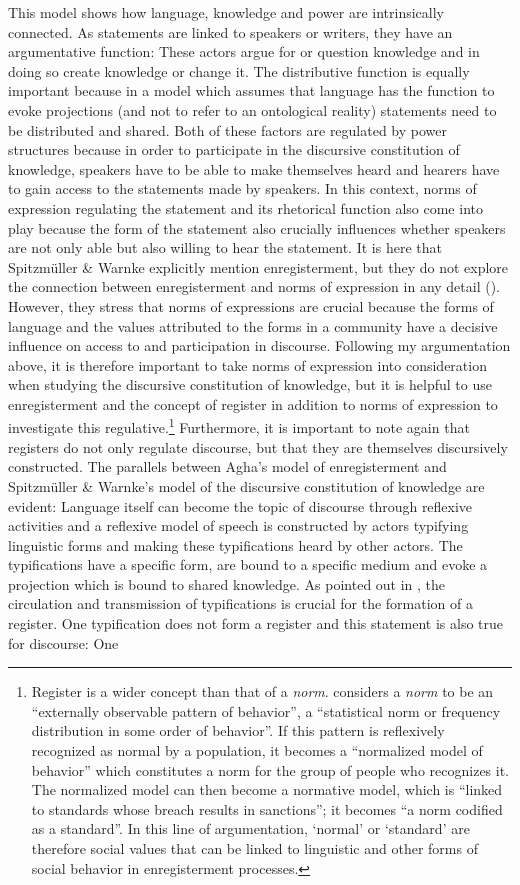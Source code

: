 This model shows how language, knowledge and power are intrinsically connected. As statements are linked to speakers or writers, they have an argumentative function: These actors argue for or question knowledge and in doing so create knowledge or change it. The distributive function is equally important because in a model which assumes that language has the function to evoke projections (and not to refer to an ontological reality) statements need to be distributed and shared. Both of these factors are regulated by power structures because in order to participate in the discursive constitution of knowledge, speakers have to be able to make themselves heard and hearers have to gain access to the statements made by speakers. In this context, norms of expression regulating the statement and its rhetorical function also come into play because the form of the statement also crucially influences whether speakers are not only able but also willing to hear the statement. It is here that Spitzmüller \& Warnke explicitly mention enregisterment, but they do not explore the connection between enregisterment and norms of expression in any detail (\citeyear[61]{Spitzmuller2011}). However, they stress that norms of expressions are crucial because the forms of language and the values attributed to the forms in a community have a decisive influence on access to and participation in discourse. Following my argumentation above, it is therefore important to take norms of expression into consideration when studying the discursive constitution of knowledge, but it is helpful to use enregisterment and the concept of register in addition to norms of expression to investigate this regulative.\footnote{Register is a wider concept than that of a \textit{norm}. \citet[126]{Agha2007} considers  a \textit{norm} to be an “externally observable pattern of behavior”, a “statistical norm or frequency distribution in some order of behavior”. If this pattern is reflexively recognized as normal by a population, it becomes a “normalized model of behavior” which constitutes a norm for the group of people who recognizes it. The normalized model can then become a normative model, which is “linked to standards whose breach results in sanctions”; it becomes “a norm codified as a standard”. In this line of argumentation, ‘normal’ or ‘standard’ are therefore social values that can be linked to linguistic and other forms of social behavior in enregisterment processes.} Furthermore, it is important to note again that registers do not only regulate discourse, but that they are themselves discursively constructed. The parallels between Agha’s model of enregisterment and Spitzmüller \& Warnke’s model of the discursive constitution of knowledge are evident: Language itself can become the topic of discourse through reflexive activities and a reflexive model of speech is constructed by actors typifying linguistic forms and making these typifications heard by other actors. The typifications have a specific form, are bound to a specific medium and evoke a projection which is bound to shared knowledge. As pointed out in , the circulation and transmission of typifications is crucial for the formation of a register. One typification does not form a register and this statement is also true for discourse: One 